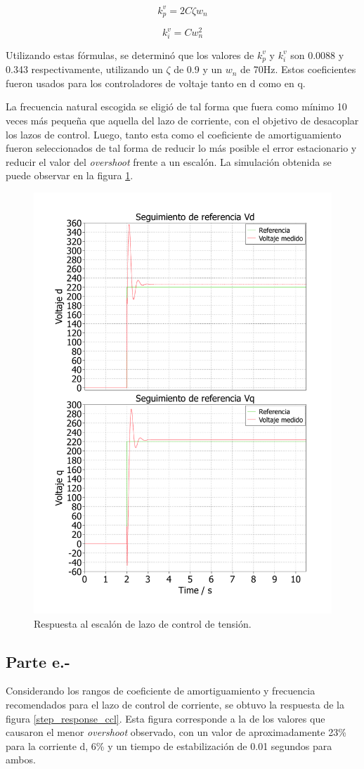 \begin{equation}
    k_p^v = 2C\zeta w_{n}
\end{equation}

\begin{equation}
    k_i^v = Cw_{n}^2
\end{equation}

Utilizando estas fórmulas, se determinó que los valores de $k_p^v$ y $k_i^v$ son 0.0088 y 0.343 respectivamente, utilizando un $\zeta$ de 0.9 y un $w_{n}$ de 70Hz. Estos coeficientes fueron usados para los controladores de voltaje tanto en d como en q. 

La frecuencia natural escogida se eligió de tal forma que fuera como mínimo 10 veces más pequeña que aquella del lazo de corriente, con el objetivo de desacoplar los lazos de control. Luego, tanto esta como el coeficiente de amortiguamiento fueron seleccionados de tal forma de reducir lo más posible el error estacionario y reducir el valor del \textit{overshoot} frente a un escalón. La simulación obtenida se puede observar en la figura \ref{step_response_vcl}.


\begin{figure}
   \centering
   \includegraphics[width=0.5\linewidth]{Tarea 1/report/imagenes/p1c/respuesta_escalon_vcl.pdf}
   \caption{Respuesta al escalón de lazo de control de tensión.}
   \label{step_response_vcl}
\end{figure}

\subsection{Parte e.-}
Considerando los rangos de coeficiente de amortiguamiento y frecuencia recomendados para el lazo de control de corriente, se obtuvo la respuesta de la figura \ref{step_response_ccl}. Esta figura corresponde a la de los valores que causaron el menor \textit{overshoot} observado, con un valor de aproximadamente 23\% para la corriente d, 6\% y un tiempo de estabilización de 0.01 segundos para ambos.  


